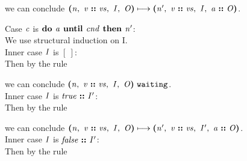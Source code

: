 \documentclass[12pt]{article}
\begin{document}
we can conclude
$\steps{
   \cfg{\nterm{n}}{\cons{\nterm{v}}{\nterm{vs}}}{\nterm{I}}{\nterm{O}}
 }{
   \cfg{\nterm{n'}}{\cons{\nterm{v}}{\nterm{vs}}}{\nterm{I}}{\cons{\nterm{a}}{\nterm{O}}}
 }$.

Case $\nterm{c}$ is $\dountil{\nterm{a}}{\nterm{cnd}}{\nterm{n'}}$:\\

We use structural induction on I.\\

Inner case $\nterm{I}$ is $[\ ]$:\\

Then by the rule

\begin{mathpar}
\end{mathpar}

we can conclude
$\waiting{\cfg{\nterm{n}}{\cons{\nterm{v}}{\nterm{vs}}}{\nterm{I}}{\nterm{O}}}$.\\

Inner case $\nterm{I}$ is $\cons{\nterm{true}}{\nterm{I'}}$:\\

Then by the rule

\begin{mathpar}
\end{mathpar}

we can conclude
$\steps{
   \cfg{\nterm{n}}{\cons{\nterm{v}}{\nterm{vs}}}{\nterm{I}}{\nterm{O}}
 }{
   \cfg{\nterm{n'}}{\cons{\nterm{v}}{\nterm{vs}}}{\nterm{I'}}{\cons{\nterm{a}}{\nterm{O}}}
 }$.\\

Inner case $\nterm{I}$ is $\cons{\nterm{false}}{\nterm{I'}}$:\\

Then by the rule

\begin{mathpar}
\end{mathpar}
\end{document}
